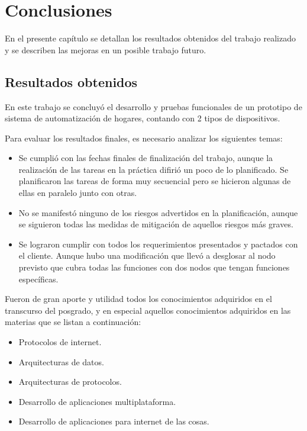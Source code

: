 \chapter{Conclusiones}

\label{Chapter5}

En el presente capítulo se detallan los resultados obtenidos del trabajo realizado y se describen las mejoras en un posible trabajo futuro.

\section{Resultados obtenidos}

En este trabajo se concluyó el desarrollo y pruebas funcionales de un prototipo de sistema de automatización de hogares, contando con 2 tipos de dispositivos.

Para evaluar los resultados finales, es necesario analizar los siguientes temas:

\begin{itemize}
	\item Se cumplió con las fechas finales de finalización del trabajo, aunque la realización de las tareas en la práctica difirió un poco de lo planificado. Se planificaron las tareas de forma muy secuencial pero se hicieron algunas de ellas en paralelo junto con otras.
	\item No se manifestó ninguno de los riesgos advertidos en la planificación, aunque se siguieron todas las medidas de mitigación de aquellos riesgos más graves.
	\item Se lograron cumplir con todos los requerimientos presentados y pactados con el cliente. Aunque hubo una modificación que llevó a desglosar al nodo previsto que cubra todas las funciones con dos nodos que tengan funciones específicas.
\end{itemize}

Fueron de gran aporte y utilidad todos los conocimientos adquiridos en el transcurso del posgrado, y en especial aquellos conocimientos adquiridos en las materias que se listan a continuación:

\begin{itemize}
	\item Protocolos de internet.
	\item Arquitecturas de datos.
	\item Arquitecturas de protocolos.
	\item Desarrollo de aplicaciones multiplataforma.
	\item Desarrollo de aplicaciones para internet de las cosas.
\end{itemize}

